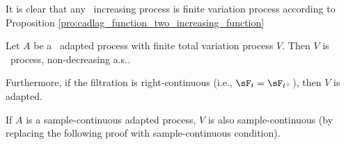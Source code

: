 \begin{example}\label{exa:cadlag_increasing_process_is_of_finite_variation}
It is clear that any \cadlag\ increasing process is finite variation process according to Proposition \ref{pro:cadlag_function_two_increasing_function}
\end{example}

\begin{lemma}\label{lem:cadlag_sample_continuous_process_finite_variation_process}
Let $A$ be a \cadlag\ adapted process with finite total variation process $V$. Then $V$ is \cadlag\ process, non-decreasing a.s..%

Furthermore, if the filtration is right-continuous (i.e., $\sF_t = \sF_{t^+}$), then $V$ is adapted.%
\end{lemma}

\begin{remark}
If $A$ is a sample-continuous adapted process, $V$ is also sample-continuous (by replacing the following proof with sample-continuous condition).
\end{remark}

